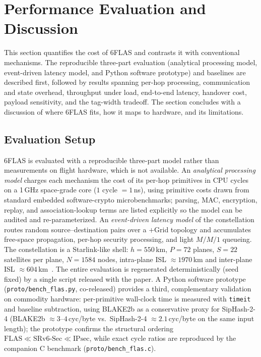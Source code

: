 \section{Performance Evaluation and Discussion}
\label{sec:exp}

This section quantifies the cost of 6FLAS and contrasts it with conventional
mechanisms. The reproducible three-part evaluation (analytical processing model,
event-driven latency model, and Python software prototype) and baselines are described first,
followed by results spanning per-hop processing, communication and state
overhead, throughput under load, end-to-end latency, handover cost, payload
sensitivity, and the tag-width tradeoff. The section concludes with a discussion
of where 6FLAS fits, how it maps to hardware, and its limitations.

\subsection{Evaluation Setup}
\label{sec:setup}

6FLAS is evaluated with a reproducible three-part model rather than measurements on
flight hardware, which is not available.
An \emph{analytical processing model} charges each mechanism the cost of its
per-hop primitives in CPU cycles on a 1\,GHz space-grade core ($1$ cycle
$=1$\,ns), using primitive costs drawn from standard embedded software-crypto
microbenchmarks; parsing, MAC, encryption, replay, and association-lookup terms
are listed explicitly so the model can be audited and re-parameterized.
An \emph{event-driven latency model} of the constellation routes random
source--destination pairs over a $+$Grid topology and accumulates free-space
propagation, per-hop security processing, and light $M/M/1$ queueing.
The constellation is a Starlink-like shell: $h=550$\,km, $P=72$ planes,
$S=22$ satellites per plane, $N=1584$ nodes, intra-plane ISL $\approx1970$\,km
and inter-plane ISL $\approx604$\,km~\cite{del2019,bhattacherjee2023}. The entire evaluation is regenerated
deterministically (seed fixed) by a single script released with the paper.
A Python software prototype (\texttt{proto/bench\_flas.py}, co-released)
provides a third, complementary validation on commodity hardware: per-primitive
wall-clock time is measured with \texttt{timeit} and baseline subtraction,
using BLAKE2b as a conservative proxy for SipHash-2-4 (BLAKE2b
$\approx3$--$4$\,cyc/byte vs.\ SipHash-2-4 $\approx2.1$\,cyc/byte on the same
input length); the prototype confirms the structural ordering
$\text{FLAS} \ll \text{SRv6-Sec} \ll \text{IPsec}$, while exact cycle ratios
are reproduced by the companion C benchmark (\texttt{proto/bench\_flas.c}).

